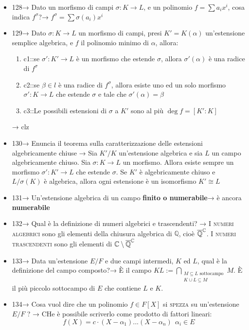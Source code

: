 \documentclass[A4,12pt]{article}
\newcommand{\C}{\mathbb{C}}
\newcommand{\Q}{\mathbb{Q}}
\renewcommand{\subset}{\subseteq}
\begin{document}
\begin{itemize}[noitemsep]
		\item 128→ Dato un morfismo di campi $ \sigma: K\to L $, e un polinomio $ f=\sum a_ix^i $, cosa indica $ f^\sigma $?→ $ f^\sigma = \sum \sigma(a_i)x^i $ 
		\item 129→ Dato $ \sigma:K\to L $ un morfismo di campi, presi $ K'=K(\alpha) $ un'estensione semplice algebrica, e $ f $ il polinomio minimo di $ \alpha $, allora: \begin{enumerate}
			\item {{c1::se $ \sigma':K'\to L $ è un morfismo che estende $ \sigma $, allora $ \sigma'(\alpha) $ è una radice di $ f^\sigma $}}
			\item {{c2::se $ \beta \in l$ è una radice di $ f^\sigma $, allora esiste uno ed un solo morfismo $ \sigma':K\to L $ che estende $ \sigma $ e tale che $ \sigma'(\alpha) = \beta $}}
			\item {{c3::Le possibili estensioni di $ \sigma $ a $ K' $ sono al più $ \deg f = [K':K] $}}
		\end{enumerate}→ clz
		\item 130→ Enuncia il teorema sulla caratterizzazione delle estensioni algebricamente chiuse → Sia $ K'/K $ un'estensione algebrica e sia $ L $ un campo algebricamente chiuso. Sia $ \sigma:K\to L $ un morfismo. Allora esiste sempre un morfismo $ \sigma':K'\to L $ che estende $ \sigma $. Se $ K' $ è algebricamente chiuso e $ L/\sigma(K) $ è algebrica, allora ogni estensione è un isomorfismo $ K'\cong L $
		\item 131→ Un'estensione algebrica di un campo \textbf{finito o numerabile}→ è ancora \textbf{numerabile}
		\item 132→ Qual è la definizione di numeri algebrici e trascendenti? → I \textsc{numeri algebrici } sono gli elementi della chiusura algebrica di $ \Q $, cioè $ \overline{\Q}\strut^{\C} $. I \textsc{numeri trascendenti} sono gli elementi di $ \C\setminus \overline{\Q}\strut^{\C}  $
		\item 133→ Data un'estensione $ E/F $ e due campi intermedi, $ K $ ed $ L $, qual è la definizione del campo composto?→ È il campo $ KL:= \bigcap\limits_{\substack{M\subset L\text{ sottocampo}\\ K\cup L\subset M }} M$. È il più piccolo sottocampo di $ E $ che contiene $ L $ e $ K $.
		\item 134→ Cosa vuol dire che un polinomio $ f\in F[X] $ si \textsc{spezza} su un'estensione $ E/F $ ? → CHe è possibile scriverlo come prodotto di fattori lineari: \[ f(X) = c\cdot (X-\alpha_1)...(X-\alpha_n)\ \ \alpha_i \in E\]

\end{itemize}
\end{document}
